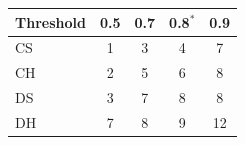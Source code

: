 \begin{tabular}{lcccc}
\toprule
Threshold & 0.5 & 0.7 & 0.8$^\ast$ & 0.9 \\
\midrule
CS & 1 & 3 & 4 & 7 \\
CH & 2 & 5 & 6 & 8 \\
DS & 3 & 7 & 8 & 8 \\
DH & 7 & 8 & 9 & 12 \\
\bottomrule
\end{tabular}
